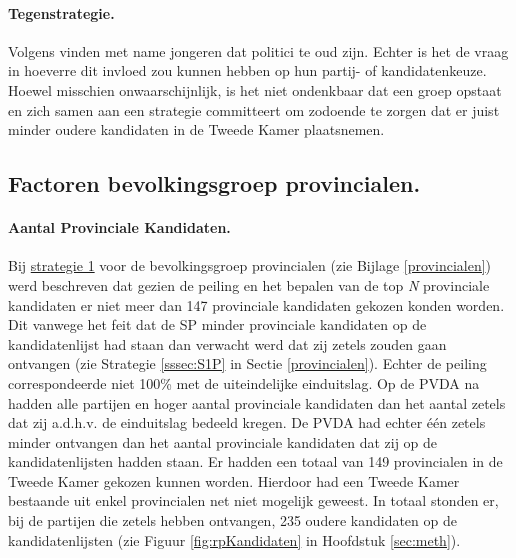 \paragraph{Tegenstrategie.}
Volgens \cite{aalberts2006aantrekkelijke} vinden met name jongeren dat politici te oud zijn. Echter is het de vraag in hoeverre dit invloed zou kunnen hebben op hun partij- of kandidatenkeuze. Hoewel misschien onwaarschijnlijk, is het niet ondenkbaar dat een groep opstaat en zich samen aan een strategie committeert om zodoende te zorgen dat er juist minder oudere kandidaten in de Tweede Kamer plaatsnemen. 

\subsection{Factoren bevolkingsgroep provincialen.}
\label{percP}

\paragraph{Aantal Provinciale Kandidaten.} 
Bij \hyperref[S1A]{strategie 1} voor de bevolkingsgroep provincialen (zie Bijlage \ref{provincialen}) werd beschreven dat gezien de peiling en het bepalen van de top \textit{N} provinciale kandidaten er niet meer dan 147 provinciale kandidaten gekozen konden worden. Dit vanwege het feit dat de SP minder provinciale kandidaten op de kandidatenlijst had staan dan verwacht werd dat zij zetels zouden gaan ontvangen (zie Strategie \ref{sssec:S1P} in Sectie \ref{provincialen}). Echter de peiling correspondeerde niet 100\% met de uiteindelijke einduitslag. Op de PVDA na hadden alle partijen en hoger aantal provinciale kandidaten dan het aantal zetels dat zij a.d.h.v. de einduitslag bedeeld kregen. De PVDA had echter één zetels minder ontvangen dan het aantal provinciale kandidaten dat zij op de kandidatenlijsten hadden staan. Er hadden een totaal van 149 provincialen in de Tweede Kamer gekozen kunnen worden. Hierdoor had een Tweede Kamer bestaande uit enkel provincialen net niet mogelijk geweest. In totaal stonden er, bij de partijen die zetels hebben ontvangen, 235 oudere kandidaten op de kandidatenlijsten (zie Figuur \ref{fig:rpKandidaten} in Hoofdstuk \ref{sec:meth}).

